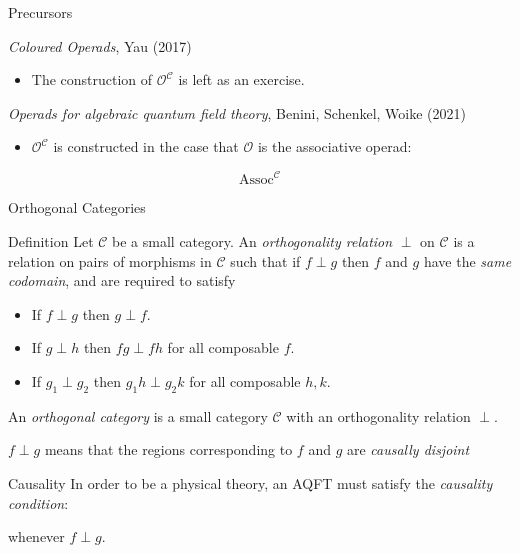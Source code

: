\documentclass[presentation]{beamer}
\begin{document}
\begin{frame}[label={sec:orgbca468b}]{Precursors}
\begin{block}{\emph{Coloured Operads}, Yau (2017)}
\begin{itemize}
\item The construction of \(\mathcal{O}^{\mathcal{C}}\) is left as an exercise.
\end{itemize}

\bigskip
\end{block}
\begin{block}{\emph{Operads for algebraic quantum field theory}, Benini, Schenkel, Woike (2021)}
\begin{itemize}
\item \(\mathcal{O}^{\mathcal{C}}\) is constructed in the case that \(\mathcal{O}\) is the associative operad:
\end{itemize}
\[
\operatorname{Assoc}^{\mathcal{C}}
\]
\end{block}
\end{frame}
\begin{frame}[label={sec:org1240079},fragile]{Orthogonal Categories}
 \begin{block}{Definition}
Let \(\mathcal{C}\) be a small category. An \emph{orthogonality relation} \(\perp\) on \(\mathcal{C}\) is a relation on pairs of morphisms in \(\mathcal{C}\) such that if \(f \perp g\)
then \(f\) and \(g\) have the \emph{same codomain}, and are required to satisfy

\begin{itemize}
\item If \(f \perp g\) then \(g \perp f\).

\item If \(g \perp h\) then \(fg \perp fh\) for all composable \(f\).

\item If \(g_1 \perp g_2\) then \(g_1 h \perp g_2 k\) for all composable \(h,k\).
\end{itemize}

\bigskip 
An \emph{orthogonal category} is a small category \(\mathcal{C}\) with an orthogonality relation \(\perp\).

 \(f \perp g\) means that the regions corresponding to \(f\) and \(g\) are \emph{causally disjoint}
\end{block}
\end{frame}
\begin{frame}[label={sec:orgdc1242b}]{Causality}
In order to be a physical theory, an AQFT must satisfy the \emph{causality condition}:

\begin{center}
\end{center}

\bigskip

whenever \(f \perp g\).
\end{frame}
\end{document}
